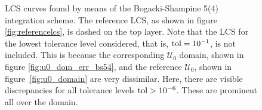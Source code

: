 \begin{figure}[htpb]
    \centering
    
    \caption[LCS curves found by means of the Bogacki-Shampine 5(4) integration
    scheme]{
        LCS curves found by means of the Bogacki-Shampine 5(4) integration
        scheme. The reference LCS, as shown in figure
        \ref{fig:referencelcs}, is dashed on the top layer. Note that
        the LCS for the lowest tolerance level considered, that is,
        $\textnormal{tol}=10^{-1}$, is not included. This is because the
        corresponding $\mathcal{U}_{0}$ domain, shown in figure
        \ref{fig:u0_dom_err_bs54}, and the reference $\mathcal{U}_{0}$, shown
        in figure~\ref{fig:u0_domain} are very dissimilar. Here, there are visible
        discrepancies for all tolerance levels $\textnormal{tol}>10^{-6}$.
        These are prominent all over the domain.}
    \label{fig:lcs_rkbs54}
\end{figure}
